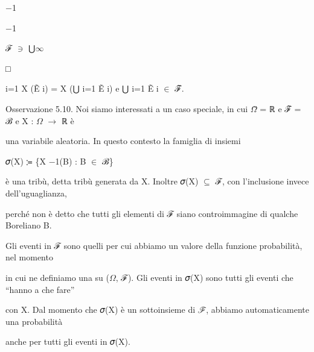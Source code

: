 \documentclass[a4paper,portrait,12pt]{article}
\begin{document}
$-$1


$-$1


\begin{flushleft}
ℱ $\ni$ ⋃$\infty$
\end{flushleft}


□


\begin{flushleft}
i=1 X (Ẽ i) = X (⋃ i=1 Ẽ i) e ⋃ i=1 Ẽ i $\in$ ℱ̃.
\end{flushleft}


\begin{flushleft}
Osservazione 5.10. Noi siamo interessati a un caso speciale, in cui $\Omega$̃ = ℝ e ℱ̃ = ℬ e X : $\Omega$ $\rightarrow$ ℝ \`{e}
\end{flushleft}


\begin{flushleft}
una variabile aleatoria. In questo contesto la famiglia di insiemi
\end{flushleft}


\begin{flushleft}
𝜎(X) ≔ \{X $-$1(B) : B $\in$ ℬ\}
\end{flushleft}


\begin{flushleft}
\`{e} una tribù, detta tribù generata da X. Inoltre 𝜎(X) $\subseteq$ ℱ, con l'inclusione invece dell'uguaglianza,
\end{flushleft}


\begin{flushleft}
perch\'{e} non \`{e} detto che tutti gli elementi di ℱ siano controimmagine di qualche Boreliano B.
\end{flushleft}


\begin{flushleft}
Gli eventi in ℱ sono quelli per cui abbiamo un valore della funzione probabilit\`{a}, nel momento
\end{flushleft}


\begin{flushleft}
in cui ne definiamo una su ($\Omega$, ℱ). Gli eventi in 𝜎(X) sono tutti gli eventi che {``}hanno a che fare''
\end{flushleft}


\begin{flushleft}
con X. Dal momento che 𝜎(X) \`{e} un sottoinsieme di ℱ, abbiamo automaticamente una probabilit\`{a}
\end{flushleft}


\begin{flushleft}
anche per tutti gli eventi in 𝜎(X).
\end{flushleft}
\end{document}
